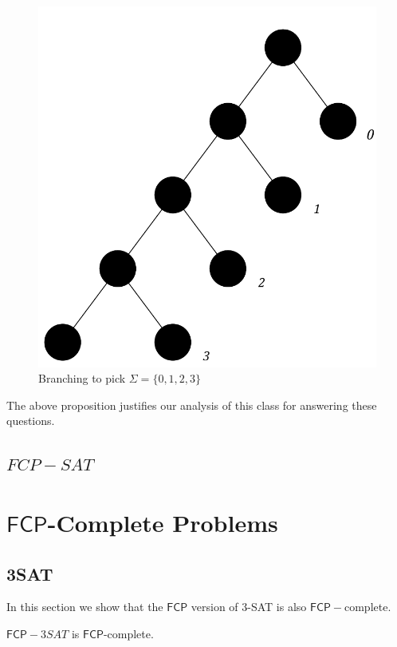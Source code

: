 \documentclass[runningheads,a4paper]{llncs}
\begin{document}
\begin{figure}
\centering
\label{fig:branching}
\includegraphics[width=0.4\linewidth]{branching.pdf}
\caption{Branching to pick $\Sigma = \{ 0, 1, 2, 3 \}$}
\end{figure}

The above proposition justifies our analysis of this class for answering these questions.

\subsection{$FCP-SAT$}

\section{$\mathsf{FCP}$-Complete Problems}

\subsection{3SAT}

In this section we show that the $\mathsf{FCP}$ version of 3-SAT is also $\mathsf{FCP}-$complete. 

\begin{theorem}
$\mathsf{FCP}-3SAT$ is $\mathsf{FCP}$-complete. 
\end{theorem} 
\end{document}
